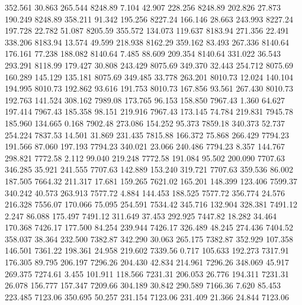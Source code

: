  352.561   30.863  265.544      8248.89
   7.104   42.907  228.256      8248.89
 202.826   27.873  190.249      8248.89
 358.211   91.342  195.256      8227.24
 166.146   28.663  243.993      8227.24
 197.728   22.782   51.087      8205.59
 355.572  134.073  119.637      8183.94
 271.356   22.491  338.206      8183.94
  13.574   49.599  218.938      8162.29
 359.162   83.493  267.336      8140.64
 176.161   77.238  188.082      8140.64
   7.485   88.609  209.354      8140.64
 331.022   36.543  293.291      8118.99
 179.427   30.808  243.429      8075.69
 349.370   32.443  254.712      8075.69
 160.289  145.129  135.181      8075.69
 349.485   33.778  263.201      8010.73
  12.024  140.104  194.995      8010.73
 192.862   93.616  191.753      8010.73
 167.856   93.561  267.430      8010.73
 192.763  141.524  308.162      7989.08
 173.765   96.153  158.850      7967.43
   1.360   64.627  197.414      7967.43
 185.358   98.151  219.916      7967.43
 173.145   74.784  219.831      7945.78
 185.960  134.665    0.168      7902.48
 273.086  154.252   95.373      7859.18
 340.373   52.737  254.224      7837.53
  14.501   31.869  231.435      7815.88
 166.372   75.868  266.429      7794.23
 191.566   87.060  197.193      7794.23
 340.021   23.066  240.486      7794.23
   8.357  144.767  298.821      7772.58
   2.112   99.040  219.248      7772.58
 191.084   95.502  200.090      7707.63
 346.285   35.921  241.555      7707.63
 142.889  153.240  319.721      7707.63
 359.536   86.002  187.505      7664.32
 211.317   17.681  159.265      7621.02
 165.201  148.399  123.406      7599.37
 340.242   40.573  263.913      7577.72
   4.884  144.453  188.525      7577.72
 356.774   24.576  216.328      7556.07
 170.066   75.095  254.591      7534.42
 345.716  132.904  328.381      7491.12
   2.247   86.088  175.497      7491.12
 311.649   37.453  292.925      7447.82
  18.282   34.464  170.368      7426.17
 177.500   84.254  239.944      7426.17
 326.489   48.245  274.436      7404.52
 358.037   38.364  232.500      7382.87
 342.290   30.063  265.175      7382.87
 352.929  107.358  146.501      7361.22
 198.361   24.958  219.602      7339.56
   0.717  105.633  192.273      7317.91
 176.305   89.795  206.197      7296.26
 204.430   42.834  214.961      7296.26
 348.069   45.917  269.375      7274.61
   3.455  101.911  118.566      7231.31
 206.053   26.776  194.311      7231.31
  26.078  156.777  157.347      7209.66
 304.189   30.842  290.589      7166.36
   7.620   85.453  223.485      7123.06
 350.695   50.257  231.154      7123.06
 231.409   21.366   24.844      7123.06
